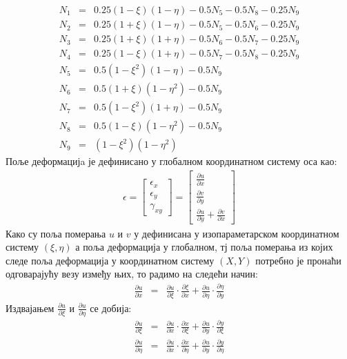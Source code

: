 \documentclass[11pt, a4paper]{article}
\begin{document}
\begin{eqnarray}
N_1 &=& 0.25(1 - \xi)(1- \eta) - 0.5N_5 -0.5 N_8 - 0.25N_9\\
N_2 &=& 0.25(1 + \xi)(1-\eta) -0.5N_5 -0.5N_6 - 0.25N_9\\ 
N_3 &=& 0.25(1+ \xi)(1+\eta) -0.5N_6 -0.5N_7 -0.25N_9\\
N_4 &=&  0.25(1-\xi)(1+\eta) -0.5N_7 - 0.5N_8 - 0.25N_9\\
N_5 &=& 0.5(1 - \xi ^2)(1- \eta) -0.5N_9\\
N_6 &=& 0.5 (1+ \xi) (1- \eta ^ 2) -0.5 N_9\\
N_7 &=& 0.5(1 - \xi ^2)(1+ \eta) -0.5 N_9\\
N_8 &=& 0.5(1- \xi)(1-\eta ^2) -0.5N_9\\
N_9 &=& (1-\xi ^2)(1- \eta ^2)
\end{eqnarray}
Поље деформацијa је дефинисано у глобалном координатном систему оса као:
\begin{align}
\epsilon = 
\begin{bmatrix}
\epsilon_x \\
\epsilon_y \\
\gamma _{xy}
\end{bmatrix}
=
\begin{bmatrix}
\frac{\partial u}{\partial x}\\
\frac{\partial v}{\partial y}\\
\frac{\partial u}{\partial y} + \frac{\partial v}{\partial x}
\end{bmatrix}
\end{align}
Како су поља померања $u$ и $v$ у дефинисана у изопараметарском координатном систему $(\xi, \eta)$ а поља деформација у глобалном, тј поља померања из којих следе поља деформација у координатном систему $(X,Y)$ потребно је пронаћи одговарајућу везу између њих,
то радимо на следећи начин:
\begin{eqnarray}
\frac{\partial u}{\partial x} &=& \frac{\partial u}{\partial \xi} \cdot \frac{\partial \xi}{\partial x} + \frac{\partial u}{\partial \eta} \cdot \frac{\partial \eta}{\partial y}
\end{eqnarray}
Издвајањем $\frac{\partial u}{\partial \xi}$ и $\frac{\partial u}{\partial \eta}$ се добија:
\begin{eqnarray}
\frac{\partial u}{\partial \xi} &=& \frac{\partial u}{\partial x} \cdot \frac{\partial x}{\partial \xi} + \frac{ \partial u}{\partial y} \cdot \frac{\partial y}{\partial \xi}\\
\frac{\partial u}{\partial \eta} &=& \frac{\partial u}{\partial x} \cdot \frac{\partial x}{\partial \eta} + \frac{\partial u}{\partial y} \cdot \frac{\partial y}{\partial \eta}
\end{eqnarray}
\end{document}
